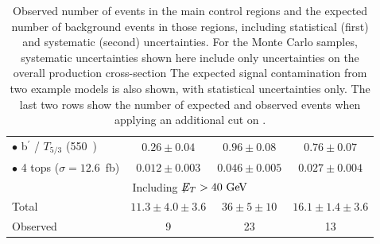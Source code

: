 \begin{table}[p]
\begin{center}
\begin{tabular}{l|c|c|c}
      $\bullet$ b$^\prime$ / $T_{5/3}$ (550~\GeV{}) & $0.26\pm0.04$ & $0.96\pm0.08$ & $0.76\pm0.07$ \\
      $\bullet$ 4 tops ($\sigma=12.6$~fb) & $0.012\pm0.003$ & $0.046\pm0.005$ & $0.027\pm0.004$ \\
      \hline
      \multicolumn{4}{c}{Including $\met{}>40 \GeV$} \\
      \hline
      Total & $11.3 \pm 4.0 \pm 3.6$ & $36 \pm 5 \pm 10$ & $16.1 \pm 1.4 \pm 3.6$ \\
      \hline
      Observed & 9 & 23 & 13 \\
      \hline
    \end{tabular}
    \caption{Observed number of events in the main control regions and the expected number of background events in those regions, including statistical (first) and systematic (second) uncertainties.
        For the Monte Carlo samples, systematic uncertainties shown here include only uncertainties on the overall production cross-section
        The expected signal contamination from two example models is also shown, with statistical uncertainties only. 
        The last two rows show the number of expected and observed events when applying an additional cut on \met{}.}\label{ctrl:ht2j_yield}
  \end{center}
\end{table}


